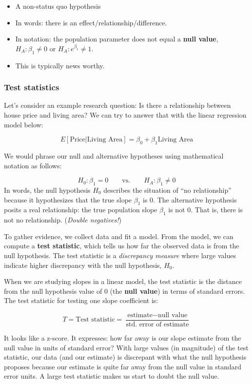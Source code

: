 \documentclass[
]{book}
\providecommand{\tightlist}{%
  \setlength{\itemsep}{0pt}\setlength{\parskip}{0pt}}
\begin{document}
\begin{itemize}
\tightlist
\item
  A non-status quo hypothesis
\item
  In words: there is an effect/relationship/difference.
\item
  In notation: the population parameter does not equal a \textbf{null value}, \(H_A: \beta_1 \neq 0\) or \(H_A: e^{\beta_1} \neq 1\).
\item
  This is typically news worthy.
\end{itemize}

\subsubsection{Test statistics}\label{test-statistics}

Let's consider an example research question: Is there a relationship between house price and living area? We can try to answer that with the linear regression model below:

\[E[\text{Price} | \text{Living Area}] = \beta_0 + \beta_1\text{Living Area}\]

We would phrase our null and alternative hypotheses using mathematical notation as follows:

\[H_0: \beta_1 = 0 \qquad \text{vs.} \qquad H_A: \beta_1 \neq 0\]
In words, the null hypothesis \(H_0\) describes the situation of ``no relationship'' because it hypothesizes that the true slope \(\beta_1\) is 0. The alternative hypothesis posits a real relationship: the true population slope \(\beta_1\) is not 0. That is, there is not no relationship. (\emph{Double negatives!})

To gather evidence, we collect data and fit a model. From the model, we can compute a \textbf{test statistic}, which tells us how far the observed data is from the null hypothesis. The test statistic is a \emph{discrepancy measure} where large values indicate higher discrepancy with the null hypothesis, \(H_0\).

When we are studying slopes in a linear model, the test statistic is the distance from the null hypothesis value of 0 (the \textbf{null value}) in terms of standard errors. The test statistic for testing one slope coefficient is:

\[T= \text{Test statistic} = \frac{\text{estimate} - \text{null value}}{\text{std. error of estimate}}\]

It looks like a z-score. It expresses: how far away is our slope estimate from the null value in units of standard error? With large values (in magnitude) of the test statistic, our data (and our estimate) is discrepant with what the null hypothesis proposes because our estimate is quite far away from the null value in standard error units. A large test statistic makes us start to doubt the null value.
\end{document}
